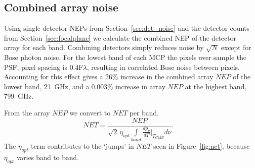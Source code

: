 \documentclass[]{spie}  %
\begin{document}

\subsection{Combined  array noise}

Using single detector NEPs from Section~\ref{sec:det_noise} and the detector counts from Section~\ref{sec:focalplane} we 
calculate the combined NEP of the detector array for each band.  Combining detectors simply reduces noise by $\sqrt{N}$ 
except for Bose photon noise. For the lowest band of each MCP the pixels over sample the PSF, pixel spacing is $0.4$F$\lambda$, resulting in correlated 
Bose noise between pixels.  Accounting for this effect gives a 26\% increase in the combined array $NEP$ of the lowest band, 21~GHz, and  
a 0.003\% increase in array $NEP$ at the highest band, 799~GHz.  

From the array $NEP$ we convert to $NET$ per band,
\begin{equation}
\label{eq:NET}
NET = \frac{NEP}{\sqrt{2} \, \eta_{opt} \int\limits_{band}\frac{dp_{\nu}}{dT}\Bigr|_{T_{CMB}} d\nu }.
\end{equation} 
The $\eta_{opt}$ term contributes to the `jumps' in $NET$ seen in Figure~\ref{fig:net}, because $\eta_{opt}$ varies band to band.  
\end{document}
